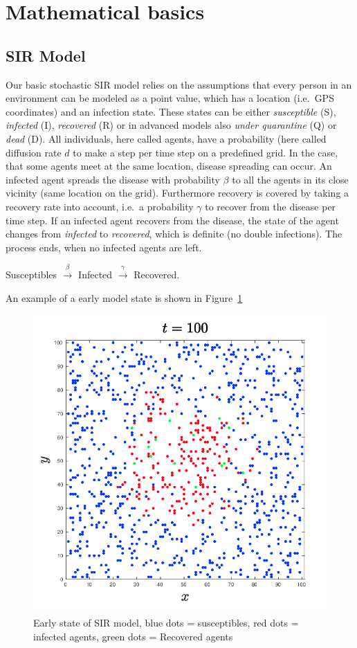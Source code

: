 \documentclass[%
 reprint,
 amsmath,amssymb,showkeys,
 aps,
]{revtex4-1}
\begin{document}


\section{\label{sec:basics}Mathematical basics}

\subsection{SIR Model}

Our basic stochastic SIR model relies on the assumptions that every person in an environment can be modeled as a point value, which has a location (i.e.\ GPS coordinates) and an infection state. These states can be either \textit{susceptible} (S), \textit{infected} (I), \textit{recovered} (R) or in advanced models also \textit{under quarantine} (Q) or \textit{dead} (D). All individuals, here called agents, have a probability (here called diffusion rate $d$ to make a step per time step on a predefined grid. In the case, that some agents meet at the same location, disease spreading can occur. An infected agent spreads the disease with probability $\beta$ to all the agents in its close vicinity (same location on the grid). Furthermore recovery is covered by taking a recovery rate into account, i.e.\ a probability $\gamma$ to recover from the disease per time step. If an infected agent recovers from the disease, the state of the agent changes from \textit{infected} to \textit{recovered}, which is definite (no double infections). The process ends, when no infected agents are left.
\begin{center}
	Susceptibles $\overset{\beta}{\longrightarrow}$ Infected $\overset{\gamma}{\longrightarrow}$ Recovered.
\end{center}

An example of a early model state is shown in Figure~\ref{fig:1}

\begin{figure}[H]
	\centering
	\includegraphics[width=0.4\linewidth]{initial_setup.png}
	\caption{Early state of SIR model, blue dots = susceptibles, red dots = infected agents, green dots = Recovered agents}%
	\label{fig:1}
\end{figure}
\end{document}
